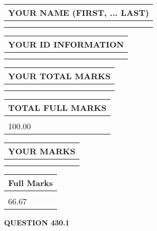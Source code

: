 \documentclass{ctexart}
\begin{document}
   
   
   
\newpage 
\setcounter{page}{ 
   430001 } 
   
   
   
   
\noindent\begin{tabular}{|l|}
\hline
YOUR NAME (FIRST, ... LAST)  \\
\hline
 \\ 
 \\ 
\hline
\end{tabular}
\hspace{0.05in} \begin{tabular}{|l|}
\hline
 YOUR   ID   INFORMATION  \\
\hline
 \\ 
 \\ 
\hline
\end{tabular}
   
   
\vspace{0.2in}\noindent\begin{tabular}{|l|}
\hline
YOUR TOTAL MARKS  \\
\hline
 \\ 
 \\ 
\hline
\end{tabular}
\hspace{0.05in} \begin{tabular}{|l|}
\hline
TOTAL FULL MARKS  \\
\hline
 \\ 
100.00 \\
\hline
\end{tabular}
   
   
 \vspace{0.2in}
 
 
 
 
   
   
  
\vspace{0.2in}
  
\noindent\begin{tabular}{|l|}
\hline
 YOUR MARKS  \\
\hline
 \\ 
 \\ 
\hline
\end{tabular}
\hspace{0.05in} \begin{tabular}{|l|}
\hline
 Full Marks  \\
\hline
 \\ 
66.67 \\
\hline
\end{tabular}
{\textbf{\Large{QUESTION
430.1 
}}}
  
\end{document}

